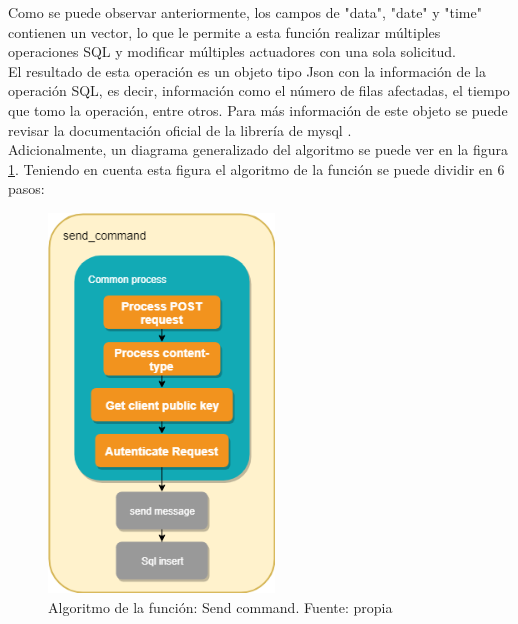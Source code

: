 Como se puede observar anteriormente, los campos de "data", "date" y "time" contienen un vector, lo que le permite a esta función realizar múltiples operaciones SQL y modificar múltiples actuadores con una sola solicitud.
\vspace{0.5cm}\\
El resultado de esta operación es un objeto tipo Json con la información de la operación SQL, es decir, información como el número de filas afectadas, el tiempo que tomo la operación, entre otros. Para más información de este objeto se puede revisar la documentación oficial de la librería de mysql \cite{mysql}.
\vspace{0.5cm}\\
Adicionalmente, un diagrama generalizado del algoritmo se puede ver en la figura \ref{fig_29}. Teniendo en cuenta esta figura el algoritmo de la función se puede dividir en 6 pasos:

\begin{figure}[htbp]
	\centerline{\includegraphics[width=6cm]{figuras/algoritmo_send_command.png}}
	\caption{Algoritmo de la función: Send command. Fuente: propia}
	\label{fig_29}
\end{figure}

